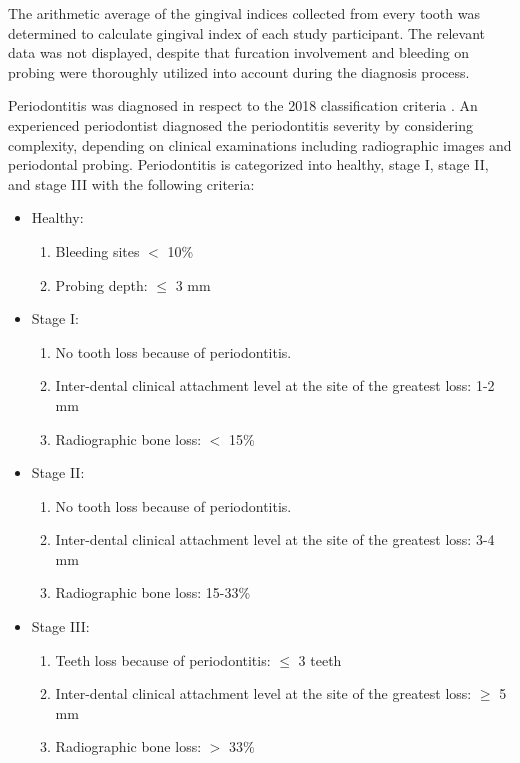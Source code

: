 \documentclass[11pt, a4paper, onecolumn, oneside]{report}
\begin{document}
                The arithmetic average of the gingival indices collected from every tooth was determined to calculate gingival index of each study participant. The relevant data was not displayed, despite that furcation involvement and bleeding on probing were thoroughly utilized into account during the diagnosis process.

                Periodontitis was diagnosed in respect to the 2018 classification criteria  \cite{Periodontitis-4, Periodontitis-13}. An experienced periodontist diagnosed the periodontitis severity by considering complexity, depending on clinical examinations including radiographic images and periodontal probing. Periodontitis is categorized into healthy, stage I, stage II, and stage III with the following criteria:
                \begin{itemize}
                    \item Healthy:
                    \begin{enumerate}
                        \item Bleeding sites $<$ 10\%
                        \item Probing depth: $\le$ 3 mm
                    \end{enumerate}

                    \item Stage I:
                    \begin{enumerate}
                        \item No tooth loss because of periodontitis.
                        \item Inter-dental clinical attachment level at the site of the greatest loss: 1-2 mm
                        \item Radiographic bone loss: $<$ 15\%
                    \end{enumerate}

                    \item Stage II:
                    \begin{enumerate}
                        \item No tooth loss because of periodontitis.
                        \item Inter-dental clinical attachment level at the site of the greatest loss: 3-4 mm
                        \item Radiographic bone loss: 15-33\%
                    \end{enumerate}

                    \item Stage III:
                    \begin{enumerate}
                        \item Teeth loss because of periodontitis: $\le$ 3 teeth
                        \item Inter-dental clinical attachment level at the site of the greatest loss: $\ge$ 5 mm
                        \item Radiographic bone loss: $>$ 33\%
                    \end{enumerate}
                \end{itemize}
\end{document}
